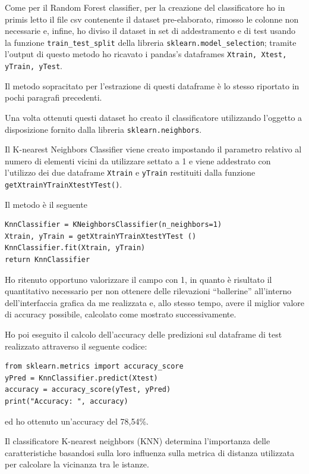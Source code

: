 Come per il Random Forest classifier, per la creazione del classificatore ho in primis letto il file csv contenente il dataset pre-elaborato, rimosso le colonne non necessarie e, infine, ho diviso il dataset in set di addestramento e di test usando la funzione \texttt{train_test_split} della libreria \texttt{sklearn.model_selection}; tramite l’output di questo metodo ho ricavato i pandas’s dataframes \texttt{Xtrain, Xtest, yTrain, yTest}.

Il metodo sopracitato per l’estrazione di questi dataframe è lo stesso riportato in pochi paragrafi precedenti.

Una volta ottenuti questi dataset ho creato il classificatore utilizzando l’oggetto a disposizione fornito dalla libreria \texttt{sklearn.neighbors}.

Il K-nearest Neighbors Classifier viene creato impostando il parametro relativo al numero di elementi vicini da utilizzare settato a 1 e viene addestrato con l’utilizzo dei due dataframe \texttt{Xtrain} e \texttt{yTrain} restituiti dalla funzione \texttt{getXtrainYTrainXtestYTest()}.

Il metodo è il seguente
\begin{verbatim}
KnnClassifier = KNeighborsClassifier(n_neighbors=1)
Xtrain, yTrain = getXtrainYTrainXtestYTest ()
KnnClassifier.fit(Xtrain, yTrain)
return KnnClassifier
\end{verbatim}

Ho ritenuto opportuno valorizzare il campo con 1, in quanto è risultato il quantitativo necessario per non ottenere delle rilevazioni “ballerine” all’interno dell’interfaccia grafica da me realizzata e, allo stesso tempo, avere il miglior valore di accuracy possibile, calcolato come mostrato successivamente.

Ho poi eseguito il calcolo dell’accuracy delle predizioni sul dataframe di test realizzato attraverso il seguente codice:
\begin{verbatim}
from sklearn.metrics import accuracy_score
yPred = KnnClassifier.predict(Xtest)
accuracy = accuracy_score(yTest, yPred)
print("Accuracy: ", accuracy)
\end{verbatim}

ed ho ottenuto un'accuracy del 78,54\%.

Il classificatore K-nearest neighbors (KNN) determina l'importanza delle caratteristiche basandosi sulla loro influenza sulla metrica di distanza utilizzata per calcolare la vicinanza tra le istanze. 

